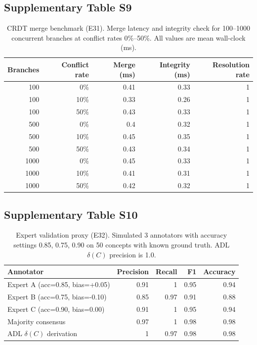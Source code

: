 \subsection{Supplementary Table S9}\label{tab:S9}
\begin{table}[htbp]
\centering
\footnotesize
\caption{CRDT merge benchmark (E31). Merge latency and integrity check for 100--1000 concurrent branches at conflict rates 0\%--50\%. All values are mean wall-clock (ms).}
\label{tab:e31-results}
\begin{tabular}{@{}rrrrr@{}}
\toprule
\textbf{Branches} & \textbf{Conflict rate} & \textbf{Merge (ms)} & \textbf{Integrity (ms)} & \textbf{Resolution rate} \\
\midrule
100 & 0\% & 0.41 & 0.33 & 1 \\
100 & 10\% & 0.33 & 0.26 & 1 \\
100 & 50\% & 0.43 & 0.33 & 1 \\
500 & 0\% & 0.4 & 0.32 & 1 \\
500 & 10\% & 0.45 & 0.35 & 1 \\
500 & 50\% & 0.43 & 0.34 & 1 \\
1000 & 0\% & 0.45 & 0.33 & 1 \\
1000 & 10\% & 0.41 & 0.31 & 1 \\
1000 & 50\% & 0.42 & 0.32 & 1 \\
\bottomrule
\end{tabular}
\end{table}

\subsection{Supplementary Table S10}\label{tab:S10}
\begin{table}[htbp]
\centering
\footnotesize
\caption{Expert validation proxy (E32). Simulated 3 annotators with accuracy settings 0.85, 0.75, 0.90 on 50 concepts with known ground truth. ADL $\delta(C)$ precision is 1.0.}
\label{tab:e32-results}
\begin{tabular}{@{}lrrrr@{}}
\toprule
\textbf{Annotator} & \textbf{Precision} & \textbf{Recall} & \textbf{F1} & \textbf{Accuracy} \\
\midrule
Expert A (acc=0.85, bias=+0.05) & 0.91 & 1 & 0.95 & 0.94 \\
Expert B (acc=0.75, bias=-0.10) & 0.85 & 0.97 & 0.91 & 0.88 \\
Expert C (acc=0.90, bias=0.00) & 0.91 & 1 & 0.95 & 0.94 \\
Majority consensus & 0.97 & 1 & 0.98 & 0.98 \\
ADL $\delta(C)$ derivation & 1 & 0.97 & 0.98 & 0.98 \\
\bottomrule
\end{tabular}
\end{table}

